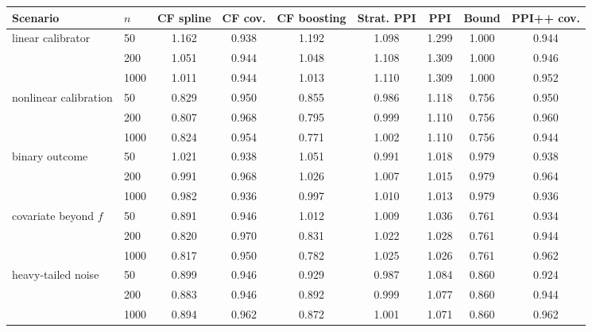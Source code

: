 \begin{tabular}{llccccccc}
\toprule
Scenario & $n$ & CF spline & CF cov. & CF boosting & Strat. PPI & PPI & Bound & PPI++ cov. \\
\midrule
linear calibrator & 50 & 1.162 & 0.938 & 1.192 & 1.098 & 1.299 & 1.000 & 0.944 \\
 & 200 & 1.051 & 0.944 & 1.048 & 1.108 & 1.309 & 1.000 & 0.946 \\
 & 1000 & 1.011 & 0.944 & 1.013 & 1.110 & 1.309 & 1.000 & 0.952 \\
nonlinear calibration & 50 & 0.829 & 0.950 & 0.855 & 0.986 & 1.118 & 0.756 & 0.950 \\
 & 200 & 0.807 & 0.968 & 0.795 & 0.999 & 1.110 & 0.756 & 0.960 \\
 & 1000 & 0.824 & 0.954 & 0.771 & 1.002 & 1.110 & 0.756 & 0.944 \\
binary outcome & 50 & 1.021 & 0.938 & 1.051 & 0.991 & 1.018 & 0.979 & 0.938 \\
 & 200 & 0.991 & 0.968 & 1.026 & 1.007 & 1.015 & 0.979 & 0.964 \\
 & 1000 & 0.982 & 0.936 & 0.997 & 1.010 & 1.013 & 0.979 & 0.936 \\
covariate beyond $f$ & 50 & 0.891 & 0.946 & 1.012 & 1.009 & 1.036 & 0.761 & 0.934 \\
 & 200 & 0.820 & 0.970 & 0.831 & 1.022 & 1.028 & 0.761 & 0.944 \\
 & 1000 & 0.817 & 0.950 & 0.782 & 1.025 & 1.026 & 0.761 & 0.962 \\
heavy-tailed noise & 50 & 0.899 & 0.946 & 0.929 & 0.987 & 1.084 & 0.860 & 0.924 \\
 & 200 & 0.883 & 0.946 & 0.892 & 0.999 & 1.077 & 0.860 & 0.944 \\
 & 1000 & 0.894 & 0.962 & 0.872 & 1.001 & 1.071 & 0.860 & 0.962 \\
\bottomrule
\end{tabular}
